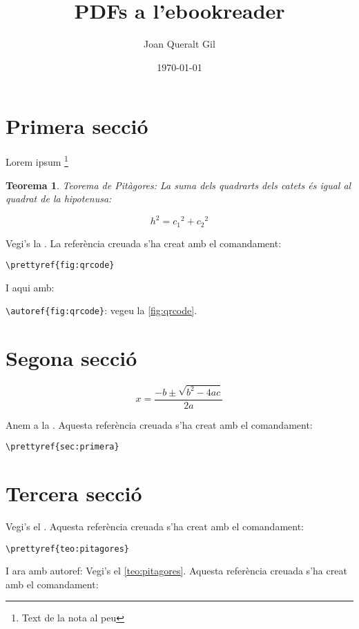 \documentclass[fontsize=12pt,%
               DIV=calc,%
               captions=tableheading,%
               numbers=noenddot,%
               parskip=full,%
               ]{scrartcl}
\author{Joan Queralt Gil}
\title{PDFs a l'ebookreader}
\date{\today}
\newtheorem{meuteo}{Teorema}       %
\begin{document}
\maketitle
\newpage
\tableofcontents
\newpage
\section{Primera secció}\label{sec:primera}
\lipsum[1]

Lorem ipsum \footnote{Text de la  nota al peu}

\lipsum[2-3]

\begin{meuteo}\label{teo:pitagores}
 Teorema de Pitàgores: La suma dels quadrarts dels catets és igual al quadrat de la hipotenusa:
 
 \[h^2 = c_1{^2} + c_2{^2} \]
\end{meuteo}

\lipsum[2-3]

Vegi's la . La referència creuada s'ha creat amb el comandament:

\verb+\prettyref{fig:qrcode}+ 

I aqui amb:

\verb+\autoref{fig:qrcode}+: vegeu la \autoref{fig:qrcode}.

\section{Segona secció}\label{sec:segona}
\lipsum[1-3]

\begin{equation}\label{eq:segongrau}
 x=\frac{-b\pm\sqrt{b^2-4ac}}{2a}
\end{equation}

Anem a la . Aquesta referència creuada s'ha creat amb el comandament:

\verb+\prettyref{sec:primera}+

\lipsum[2-3]

\section{Tercera secció}\label{sec:tercera}
\lipsum[1-3]

Vegi's el . Aquesta referència creuada s'ha creat amb el comandament:

\verb+\prettyref{teo:pitagores}+

I ara amb autoref: Vegi's el \autoref{teo:pitagores}. Aquesta referència creuada s'ha creat amb el comandament:
\end{document}
